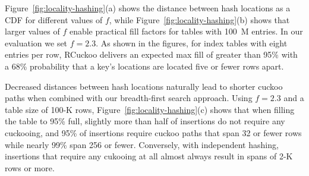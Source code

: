 Figure~\ref{fig:locality-hashing}(a) shows the distance between hash
locations as a CDF for different values of $f$,
while Figure~\ref{fig:locality-hashing}(b) shows that larger values of
$f$ enable practical fill factors for tables with 100~M entries. In
our evaluation we set $f=2.3$.  As shown in the figures, for index
tables with eight entries per row, RCuckoo delivers an expected max fill of
greater than 95\% with a 68\% probability that a key's locations are
located five or fewer rows apart.


Decreased distances between hash locations naturally lead to shorter
cuckoo paths when combined with our breadth-first search approach.
Using $f=2.3$ and a table size of 100-K rows,
Figure~\ref{fig:locality-hashing}(c) shows that when filling the table
to 95\% full, slightly more than half of insertions do not require any
cuckooing, and 95\% of insertions require cuckoo paths that span 32 or
fewer rows while nearly 99\% span 256 or fewer.  Conversely, with
independent hashing, insertions that require any cukooing at all
almost always result in spans of 2-K rows or more.
%



